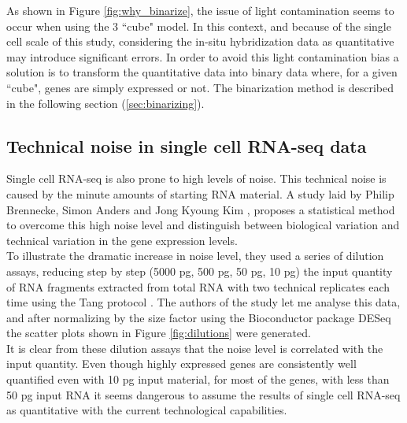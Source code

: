   As shown in Figure \ref{fig:why_binarize}, the issue of light contamination seems to occur when using the 3  ``cube" model. In this context, and because of the single cell scale of this study, considering the in-situ hybridization data as quantitative may introduce significant errors. In order to avoid this light contamination bias a solution is to transform the quantitative data into binary data where, for a given ``cube", genes are simply expressed or not. The binarization method is described in the following section (\ref{sec:binarizing}).
  


  \subsection{Technical noise in single cell RNA-seq data}
  Single cell RNA-seq is also prone to high levels of noise. This technical noise is caused by the minute amounts of starting RNA material. A study laid by Philip Brennecke, Simon Anders and Jong Kyoung Kim \cite{brennecke13}, proposes a statistical method to overcome this high noise level and distinguish between biological variation and technical variation in the gene expression levels.\\
  
  To illustrate the dramatic increase in noise level, they used a series of dilution assays, reducing step by step (5000 pg, 500 pg, 50 pg, 10 pg) the input quantity of RNA fragments extracted from total  RNA with two technical replicates each time using the Tang protocol \cite{tang09}. The authors of the study let me analyse this data, and after normalizing by the size factor using the Bioconductor package DESeq \cite{anders10} the scatter plots shown in Figure \ref{fig:dilutions} were generated. \\
  
  It is clear from these dilution assays that the noise level is correlated with the input quantity. Even though highly expressed genes are consistently well quantified even with 10 pg input material, for most of the genes, with less than 50 pg input RNA it seems dangerous to assume the results of single cell RNA-seq as quantitative with the current technological capabilities.
  
